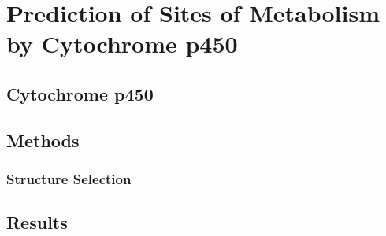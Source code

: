 \chapter[p450 Sites of Metabolism]{Prediction of Sites of Metabolism by Cytochrome p450}
\label{chapter:p450}

\section{Cytochrome p450}
\label{section:p450}


\section{Methods}
\label{section:p450_methods}

\subsection{Structure Selection}
\label{subsection:p450_structure_selection}

\section{Results}
\label{section:p450_results}
%

